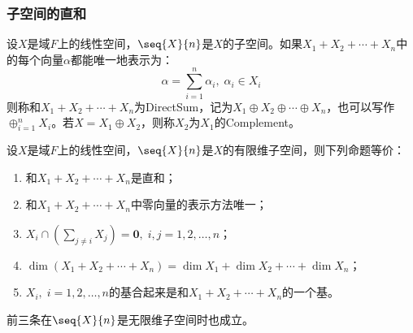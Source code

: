 \subsubsection{子空间的直和}
\begin{definition}
	设$X$是域$F$上的线性空间，$\seq{X}{n}$是$X$的子空间。如果$X_1+X_2+\cdots+X_n$中的每个向量$\alpha$都能唯一地表示为：
	\begin{equation*}
		\alpha=\sum_{i=1}^{n}\alpha_i,\;\alpha_i\in X_i
	\end{equation*}
	则称和$X_1+X_2+\cdots+X_n$为\gls{DirectSum}，记为$X_1\oplus X_2\oplus\cdots\oplus X_n$，也可以写作$\oplus_{i=1}^nX_i$。若$X=X_1\oplus X_2$，则称$X_2$为$X_1$的\gls{Complement}。
\end{definition}
\begin{theorem}\label{theo:DirectSum}
	设$X$是域$F$上的线性空间，$\seq{X}{n}$是$X$的有限维子空间，则下列命题等价：
	\begin{enumerate}
		\item 和$X_1+X_2+\cdots+X_n$是直和；
		\item 和$X_1+X_2+\cdots+X_n$中零向量的表示方法唯一；
		\item $X_i\cap\left(\sum\limits_{j\ne i}X_j\right)=\mathbf{0},\;i,j=1,2,\dots,n$；
		\item $\dim(X_1+X_2+\cdots+X_n)=\dim X_1+\dim X_2+\cdots+\dim X_n$；
		\item $X_i,\;i=1,2,\dots,n$的基合起来是和$X_1+X_2+\cdots+X_n$的一个基。
	\end{enumerate}
	前三条在$\seq{X}{n}$是无限维子空间时也成立。
\end{theorem}
